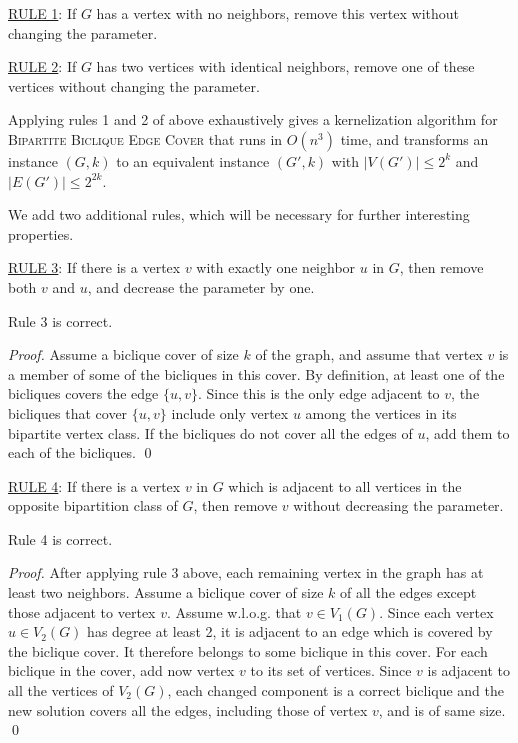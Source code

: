 \noindent \underline{\textsf{RULE 1}}: If $G$ has a vertex with
no neighbors, remove this vertex without changing the
parameter.

\noindent \underline{\textsf{RULE 2}}: If $G$ has two vertices
with identical neighbors, remove one of these vertices without
changing the parameter.

\begin{lemma}
\label{Lemma: Kernel}Applying rules 1 and 2 of above exhaustively gives a
kernelization algorithm for \textsc{Bipartite Biclique Edge
Cover} that runs in $O(n^3)$ time, and transforms an instance
$(G,k)$ to an equivalent instance $(G',k)$ with $|V(G')| \leq
2^k$ and $|E(G')| \leq 2^{2k}$.
\end{lemma}

We add two additional rules, which will be necessary
for further interesting properties.

\noindent \underline{\textsf{RULE 3}}: If there is a vertex $v$
with exactly one neighbor $u$ in $G$, then remove both $v$ and
$u$, and decrease the parameter by one.

\begin{lemma}\label{lemma: lrul3}
Rule 3 is correct.
\end{lemma}

\begin{proof}
Assume a biclique cover of size $k$ of the graph, and assume
that vertex $v$ is a member of some of the bicliques in this
cover. By definition, at least one of the bicliques covers the
edge 
$\{u,v\}$. Since this is the only edge 
adjacent to $v$, the bicliques that cover
$\{u,v\}$ include only vertex $u$ among the vertices in its
bipartite vertex class.
If the bicliques do not cover all the
edges of $u$, add them to each of the bicliques. \qed
\end{proof}


\noindent \underline{\textsf{RULE 4}}: If there is a vertex $v$
in $G$ which is adjacent to all vertices in the opposite
bipartition class of $G$, then remove $v$ without decreasing
the parameter.

\begin{lemma}\label{Lemma: lrul4}
Rule 4 is correct.
\end{lemma}

\begin{proof}
After applying rule 3 above, each remaining vertex in the graph
has at least two neighbors. Assume a biclique cover of size $k$
of all the edges except those adjacent to vertex $v$.
Assume w.l.o.g. that $v \in V_1(G)$. Since each vertex
$u \in V_2(G)$ has degree at least 2, it is adjacent to an edge
which is covered by the biclique cover. It therefore belongs to
some biclique in this cover. For each biclique in the cover,
add now vertex $v$ to its set of vertices. Since $v$ is
adjacent to all the vertices of 
$V_2(G)$, each changed component is a correct biclique and the
new solution covers all the edges, including those of vertex
$v$, and is of same size. \qed
\end{proof}

